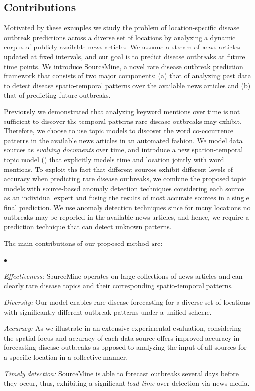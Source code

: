 \documentclass[conference]{IEEEtran}
\newcommand{\squishlist}{
   \begin{list}{$\bullet$}
    {
      \setlength{\itemsep}{0pt}
      \setlength{\parsep}{3pt}
      \setlength{\topsep}{3pt}
      \setlength{\partopsep}{0pt}
      \setlength{\leftmargin}{1.5em}
      \setlength{\labelwidth}{1em}
      \setlength{\labelsep}{0.5em} } }
\newcommand{\squishend}{
    \end{list}  }
\newcommand{\fullmodel}{{{\sf SourceMine}}\xspace}
\begin{document}
\subsection{Contributions}
\label{sec:contr}

Motivated by these examples we study the problem of location-specific disease outbreak predictions across a diverse set of locations by analyzing a dynamic corpus of publicly available news articles. We assume a stream of news articles updated at fixed intervals, and our goal is to predict disease outbreaks at future time points. We introduce \fullmodel, a novel rare disease outbreak prediction framework that consists of two major components: (a) that of analyzing past data to detect disease spatio-temporal patterns over the available news articles and (b) that of predicting future outbreaks. 

Previously we demonstrated that analyzing keyword mentions over time is not sufficient to discover the temporal patterns rare disease outbreaks may exhibit. Therefore, we choose to use topic models to discover the word co-occurrence patterns in the available news articles in an automated fashion. We model data sources as {\em evolving documents} over time, and introduce a new spation-temporal topic model () that explicitly models time and location jointly with word mentions. To exploit the fact that different sources exhibit different levels of accuracy when predicting rare disease outbreaks, we combine the proposed topic models with source-based anomaly detection techniques considering each source as an individual expert and fusing the results of most accurate sources in a single final prediction. We use anomaly detection techniques since for many locations no outbreaks may be reported in the available news articles, and hence, we require a prediction technique that can detect  unknown patterns.

The main contributions of our proposed method are:
\squishlist
\item {\em Effectiveness:} \fullmodel operates on large collections of news articles and can clearly rare disease topics and their corresponding spatio-temporal patterns.
\item {\em Diversity:} Our model enables rare-disease forecasting for a diverse set of locations with significantly different outbreak patterns under a unified scheme. 
\item {\em Accuracy:} As we illustrate in an extensive experimental evaluation, considering the spatial focus and accuracy of each data source offers improved accuracy in forecasting disease outbreaks as opposed to analyzing the input of all sources for a specific location in a collective manner. 
\item{\em Timely detection:} \fullmodel is able to forecast outbreaks several days before they occur, thus, exhibiting a significant {\em lead-time} over detection via news media. 
\squishend
\end{document}
